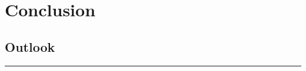 \newpage\null\thispagestyle{empty}\newpage
\clearpage{\thispagestyle{empty}\cleardoublepage}
\part{Conclusion}
% 
% 
% 
\setcounter{chapter}{8}
\chapter{Outlook}
\label{sec:outlook}
% 
%  
% 
\par
\noindent\rule{\textwidth}{2pt}
\par
% 
% 
% 
% 
% 
% 
% 
